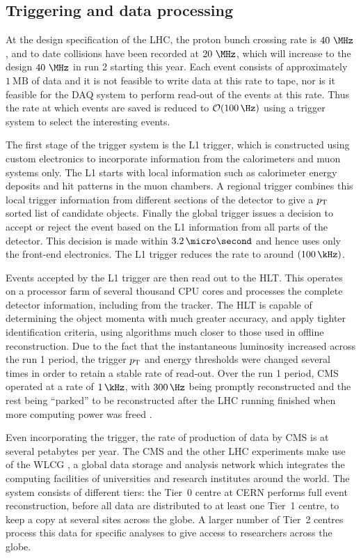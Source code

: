 \subsection{Triggering and data processing}
\label{sec:trigger}

At the design specification of the LHC, the proton bunch crossing rate is
$40~\MHz$, and to date collisions have been recorded at $20~\MHz$, which will
increase to the design $40~\MHz$ in run 2 starting this year. Each event
consists of approximately $1~\text{MB}$ of data and it is not feasible to write
data at this rate to tape, nor is it feasible for the \ac{DAQ} system to perform
read-out of the events at this rate. Thus the rate at which events are saved is
reduced to $\mathcal{O}(100\,\Hz)$ using a trigger system to select the
interesting events.

The first stage of the trigger system is the \ac{L1} trigger, which is
constructed using custom electronics to incorporate information from the
calorimeters and muon systems only. The \ac{L1} starts with local information
such as calorimeter energy deposits and hit patterns in the muon chambers. A
regional trigger combines this local trigger information from different sections
of the detector to give a $p_{\mathrm{T}}$ sorted list of candidate objects. Finally the
global trigger issues a decision to accept or reject the event based on the
\ac{L1} information from all parts of the detector. This decision is made within
$3.2\,\micro\second$ and hence uses only the front-end electronics. The \ac{L1}
trigger reduces the rate to around $(100\,\kHz)$.  

Events accepted by the \ac{L1} trigger are then read out to the \ac{HLT}. This
operates on a processor farm of several thousand CPU cores and processes the 
complete detector information, including from the tracker. The \ac{HLT}
is capable of determining the object momenta with much greater accuracy, and
apply tighter identification criteria, using algorithms much closer to those
used in offline reconstruction. Due to the fact that the instantaneous luminosity
increased across the run 1 period, the trigger $p_{\mathrm{T}}$ and energy thresholds were
changed several times in order to retain a stable rate of read-out. Over the run
1 period, CMS operated at a rate of $1\,\kHz$, with $300\,\Hz$ being promptly
reconstructed and the rest being ``parked'' to be reconstructed after the LHC running
finished when more computing power was freed \cite{CMS:2012ooa}.

Even incorporating the trigger, the rate of production of data by CMS is at
several petabytes per year. The CMS and the other LHC experiments make use of
the \ac{WLCG} \cite{web:grid}, a global data storage and analysis network which
integrates the computing facilities of universities and research institutes
around the world. The system consists of different tiers: the Tier~0 centre at
CERN performs full event reconstruction, before all data are distributed to at
least one Tier~1 centre, to keep a copy at several sites across the globe. A
larger number of Tier~2 centres process this data for specific analyses to give
access to researchers across the globe. 
